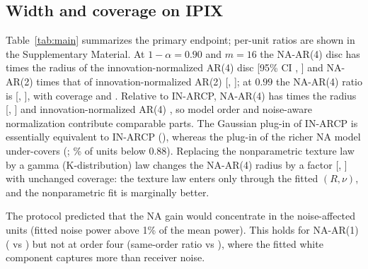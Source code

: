 \documentclass[journal]{IEEEtran}
\begin{document}
\subsection{Width and coverage on IPIX}
\begin{table}[!t]
\centering\small
\caption{Confirmatory IPIX results ($m=16$; rotations 2--3; \NUnitsConf{} session$\times$channel$\times$rotation units). Radius ratio: geometric mean over units of mean disc radius relative to IN-ARCP on the same test episodes, with 95\% day-cluster bootstrap interval. Max.\ dev.: mean over units of the largest absolute texture-quintile coverage deviation from nominal.}
\label{tab:main}
\resizebox{\textwidth}{!}{}
\end{table}
Table~\ref{tab:main} summarizes the primary endpoint; per-unit ratios are shown in the Supplementary Material. At $1-\alpha=0.90$ and $m=16$ the NA-AR(4) disc has \SameNAFourA{} times the radius of the innovation-normalized AR(4) disc [95\% CI \SameLoNAFourA, \SameHiNAFourA] and NA-AR(2) \SameNATwoA{} times that of innovation-normalized AR(2) [\SameLoNATwoA, \SameHiNATwoA]; at $0.99$ the NA-AR(4) ratio is \SameNAFourB{} [\SameLoNAFourB, \SameHiNAFourB], with coverage \CovNAFourmSixteenA{} and \CovNAFourmSixteenB. Relative to IN-ARCP, NA-AR(4) has \RatioNAFourmSixteenA{} times the radius [\RatioLoNAFourmSixteenA, \RatioHiNAFourmSixteenA] and innovation-normalized AR(4) \RatioINFourmSixteenA, so model order and noise-aware normalization contribute comparable parts. The Gaussian plug-in of IN-ARCP is essentially equivalent to IN-ARCP (\RatioGOnemSixteenA), whereas the plug-in of the richer NA model under-covers (\CovNAFourGmSixteenA; \BelowNAFourGmSixteenA\% of units below 0.88). Replacing the nonparametric texture law by a gamma (K-distribution) law changes the NA-AR(4) radius by a factor \BOneRatio{} [\BOneRatioLo, \BOneRatioHi] with unchanged coverage: the texture law enters only through the fitted $(R,\nu)$, and the nonparametric fit is marginally better.

The protocol predicted that the NA gain would concentrate in the \NNoisyConf{} noise-affected units (fitted noise power above 1\% of the mean power). This holds for NA-AR(1) (\NoisyNAOnemSixteenA{} vs \CleanNAOnemSixteenA) but not at order four (same-order ratio \SameNAFourNoisy{} vs \SameNAFourClean), where the fitted white component captures more than receiver noise.
\end{document}
